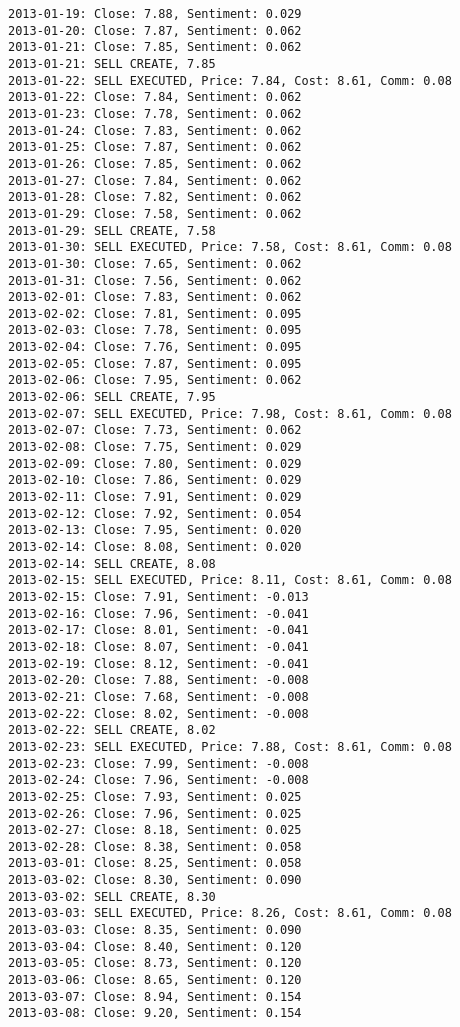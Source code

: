 \documentclass[11pt]{article}
\begin{document}
\begin{Verbatim}[commandchars=\\\{\}]
2013-01-19: Close: 7.88, Sentiment: 0.029
2013-01-20: Close: 7.87, Sentiment: 0.062
2013-01-21: Close: 7.85, Sentiment: 0.062
2013-01-21: SELL CREATE, 7.85
2013-01-22: SELL EXECUTED, Price: 7.84, Cost: 8.61, Comm: 0.08
2013-01-22: Close: 7.84, Sentiment: 0.062
2013-01-23: Close: 7.78, Sentiment: 0.062
2013-01-24: Close: 7.83, Sentiment: 0.062
2013-01-25: Close: 7.87, Sentiment: 0.062
2013-01-26: Close: 7.85, Sentiment: 0.062
2013-01-27: Close: 7.84, Sentiment: 0.062
2013-01-28: Close: 7.82, Sentiment: 0.062
2013-01-29: Close: 7.58, Sentiment: 0.062
2013-01-29: SELL CREATE, 7.58
2013-01-30: SELL EXECUTED, Price: 7.58, Cost: 8.61, Comm: 0.08
2013-01-30: Close: 7.65, Sentiment: 0.062
2013-01-31: Close: 7.56, Sentiment: 0.062
2013-02-01: Close: 7.83, Sentiment: 0.062
2013-02-02: Close: 7.81, Sentiment: 0.095
2013-02-03: Close: 7.78, Sentiment: 0.095
2013-02-04: Close: 7.76, Sentiment: 0.095
2013-02-05: Close: 7.87, Sentiment: 0.095
2013-02-06: Close: 7.95, Sentiment: 0.062
2013-02-06: SELL CREATE, 7.95
2013-02-07: SELL EXECUTED, Price: 7.98, Cost: 8.61, Comm: 0.08
2013-02-07: Close: 7.73, Sentiment: 0.062
2013-02-08: Close: 7.75, Sentiment: 0.029
2013-02-09: Close: 7.80, Sentiment: 0.029
2013-02-10: Close: 7.86, Sentiment: 0.029
2013-02-11: Close: 7.91, Sentiment: 0.029
2013-02-12: Close: 7.92, Sentiment: 0.054
2013-02-13: Close: 7.95, Sentiment: 0.020
2013-02-14: Close: 8.08, Sentiment: 0.020
2013-02-14: SELL CREATE, 8.08
2013-02-15: SELL EXECUTED, Price: 8.11, Cost: 8.61, Comm: 0.08
2013-02-15: Close: 7.91, Sentiment: -0.013
2013-02-16: Close: 7.96, Sentiment: -0.041
2013-02-17: Close: 8.01, Sentiment: -0.041
2013-02-18: Close: 8.07, Sentiment: -0.041
2013-02-19: Close: 8.12, Sentiment: -0.041
2013-02-20: Close: 7.88, Sentiment: -0.008
2013-02-21: Close: 7.68, Sentiment: -0.008
2013-02-22: Close: 8.02, Sentiment: -0.008
2013-02-22: SELL CREATE, 8.02
2013-02-23: SELL EXECUTED, Price: 7.88, Cost: 8.61, Comm: 0.08
2013-02-23: Close: 7.99, Sentiment: -0.008
2013-02-24: Close: 7.96, Sentiment: -0.008
2013-02-25: Close: 7.93, Sentiment: 0.025
2013-02-26: Close: 7.96, Sentiment: 0.025
2013-02-27: Close: 8.18, Sentiment: 0.025
2013-02-28: Close: 8.38, Sentiment: 0.058
2013-03-01: Close: 8.25, Sentiment: 0.058
2013-03-02: Close: 8.30, Sentiment: 0.090
2013-03-02: SELL CREATE, 8.30
2013-03-03: SELL EXECUTED, Price: 8.26, Cost: 8.61, Comm: 0.08
2013-03-03: Close: 8.35, Sentiment: 0.090
2013-03-04: Close: 8.40, Sentiment: 0.120
2013-03-05: Close: 8.73, Sentiment: 0.120
2013-03-06: Close: 8.65, Sentiment: 0.120
2013-03-07: Close: 8.94, Sentiment: 0.154
2013-03-08: Close: 9.20, Sentiment: 0.154

\end{Verbatim}
\end{document}
